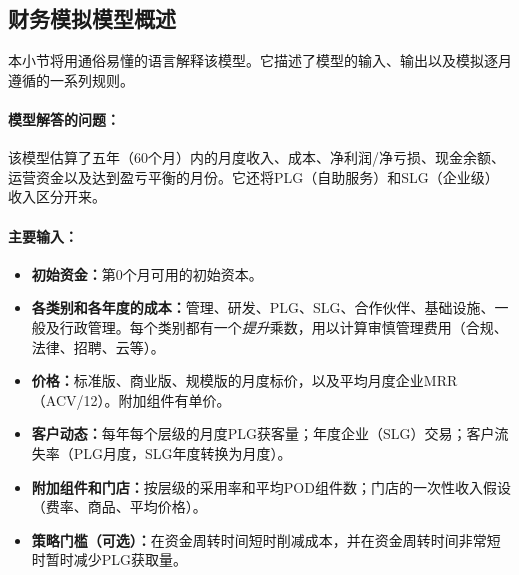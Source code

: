 \documentclass[11点, A4纸, 单面]{article}
\begin{document}
\subsection{财务模拟模型概述}
\label{subsec:simple-model}

本小节将用通俗易懂的语言解释该模型。它描述了模型的输入、输出以及模拟逐月遵循的一系列规则。

\paragraph{模型解答的问题：}
该模型估算了五年（60个月）内的月度收入、成本、净利润/净亏损、现金余额、运营资金以及达到盈亏平衡的月份。它还将PLG（自助服务）和SLG（企业级）收入区分开来。

\paragraph{主要输入：}
\begin{itemize}
\item \textbf{初始资金：}第0个月可用的初始资本。
\item \textbf{各类别和各年度的成本：}管理、研发、PLG、SLG、合作伙伴、基础设施、一般及行政管理。每个类别都有一个\emph{提升}乘数，用以计算审慎管理费用（合规、法律、招聘、云等）。
\item \textbf{价格：}标准版、商业版、规模版的月度标价，以及平均月度企业MRR（ACV/12）。附加组件有单价。
\item \textbf{客户动态：}每年每个层级的月度PLG获客量；年度企业（SLG）交易；客户流失率（PLG月度，SLG年度转换为月度）。
\item \textbf{附加组件和门店：}按层级的采用率和平均POD组件数；门店的一次性收入假设（费率、商品、平均价格）。
\item \textbf{策略门槛（可选）：}在资金周转时间短时削减成本，并在资金周转时间非常短时暂时减少PLG获取量。
\end{itemize}
\end{document}
